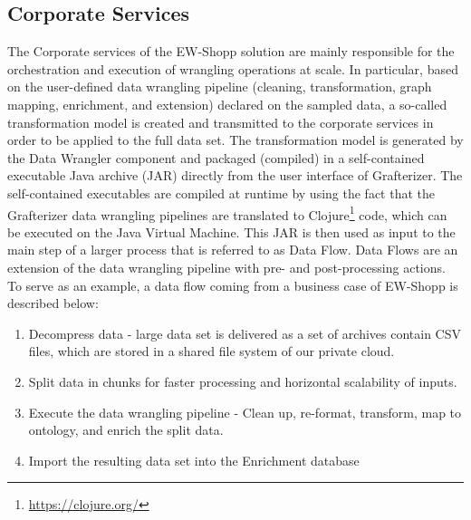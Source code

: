 \subsection{Corporate Services}\label{sec:bdr}



The Corporate services of the EW-Shopp solution are mainly responsible for the orchestration and execution of wrangling operations at scale. 
In particular, based on the user-defined data wrangling pipeline (cleaning, transformation, graph mapping, enrichment, and extension) declared on the sampled data, a so-called transformation model is created and transmitted to the corporate services in order to be applied to the full data set. The transformation model is generated by the Data Wrangler component and packaged (compiled) in a self-contained executable Java archive (JAR) directly from the user interface of Grafterizer. The self-contained executables are compiled at runtime by using the fact that the Grafterizer data wrangling pipelines are translated to Clojure\footnote{\url{https://clojure.org/}} code, which can be executed on the Java Virtual Machine. This JAR is then used as input to the main step of a larger process that is referred to as Data Flow.
Data Flows are an extension of the data wrangling pipeline with pre- and post-processing actions. 
To serve as an example, a data flow coming from a business case of EW-Shopp is described below:
\begin{enumerate}
    \item Decompress data - large data set is delivered as a set of archives contain CSV files, which are stored in a shared file system of our private cloud.
    \item Split data in chunks for faster processing and horizontal scalability of inputs.
    \item Execute the data wrangling pipeline - Clean up, re-format, transform, map to ontology, and enrich the split data. 
    \item Import the resulting data set into the Enrichment database
\end{enumerate}



